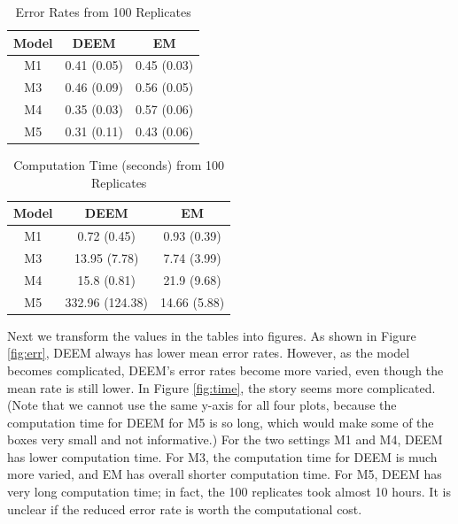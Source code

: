 \documentclass[11pt]{article}
\begin{document}
\begin{table}[H]
    \centering
    \begin{tabular}{|c|cc|}
    \hline
       Model  &  DEEM & EM \\
       \hline
         M1 & 0.41 (0.05) & 0.45 (0.03) \\
         M3 &  0.46 (0.09) & 0.56 (0.05) \\
         M4 &  0.35 (0.03) & 0.57 (0.06) \\ 
         M5 &  0.31 (0.11) & 0.43 (0.06) \\
    \hline
    \end{tabular}
    \caption{Error Rates from 100 Replicates}
    \label{tab:err}
\end{table}

\begin{table}[H]
    \centering
    \begin{tabular}{|c|cc|}
    \hline
       Model  &  DEEM & EM \\
       \hline
         M1 & 0.72 (0.45) & 0.93 (0.39) \\
         M3 &  13.95 (7.78) & 7.74 (3.99) \\
         M4 &  15.8 (0.81) & 21.9 (9.68) \\ 
         M5 &  332.96 (124.38) & 14.66 (5.88) \\
    \hline
    \end{tabular}
    \caption{Computation Time (seconds) from 100 Replicates}
    \label{tab:time}
\end{table}

Next we transform the values in the tables into figures. As shown in Figure \ref{fig:err}, DEEM always has lower mean error rates. However, as the model becomes complicated, DEEM's error rates become more varied, even though the mean rate is still lower. In Figure \ref{fig:time}, the story seems more complicated. (Note that we cannot use the same y-axis for all four plots, because the computation time for DEEM for M5 is so long, which would make some of the boxes very small and not informative.) For the two settings M1 and M4, DEEM has lower computation time. For M3, the computation time for DEEM is much more varied, and EM has overall shorter computation time. For M5, DEEM has very long computation time; in fact, the 100 replicates took almost 10 hours. It is unclear if the reduced error rate is worth the computational cost.
\end{document}

